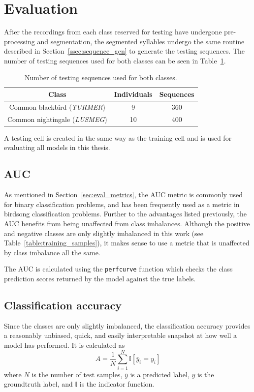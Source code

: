 \section{Evaluation}

After the recordings from each class reserved for testing have undergone
pre-processing and segmentation, the segmented syllables undergo the same
routine described in Section~\ref{ssec:sequence_gen} to generate the testing
sequences. The number of testing sequences used for both classes can be seen in
Table~\ref{table:testing_samples}.

\begin{table}[ht]
\begin{center}
\begin{tabular}{c c c}
\toprule
Class & Individuals & Sequences \\ [0.5ex]
\midrule
Common blackbird (\textit{TURMER}) & 9 & 360 \\
Common nightingale (\textit{LUSMEG}) & 10 & 400 \\
\bottomrule
\end{tabular}
\caption{Number of testing sequences used for both
classes.}\label{table:testing_samples}
\end{center}
\end{table}

A testing cell is created in the same way as the training cell and is used for
evaluating all models in this thesis.

\subsection{AUC}

As mentioned in Section~\ref{sec:eval_metrics}, the AUC metric is commonly used
for binary classification problems, and has been frequently used as a metric in
birdsong classification problems. Further to the advantages listed previously,
the AUC benefits from being unaffected from class imbalances. Although the
positive and negative classes are only slightly imbalanced in this work (see
Table~\ref{table:training_samples}), it makes sense to use a metric that is
unaffected by class imbalance all the same.

The AUC is calculated using the \texttt{perfcurve} function which checks the
class prediction scores returned by the model against the true labels.

\subsection{Classification accuracy}

Since the classes are only slightly imbalanced, the classification accuracy
provides a reasonably unbiased, quick, and easily interpretable snapshot at how
well a model has performed. It is calculated as
\begin{equation}
A = \frac{1}{N}\sum_{i=1}^{N} \mathbb{I}[\bar{y}_i = y_i]
\end{equation}
where $N$ is the number of test samples, $\bar{y}$ is a predicted label, $y$
is the groundtruth label, and $\mathbb{I}$ is the indicator function.
